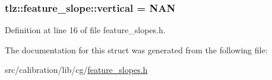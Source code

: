 \subsubsection[{\texorpdfstring{vertical}{vertical}}]{ tlz\+::feature\+\_\+slope\+::vertical = N\+AN}\hypertarget{structtlz_1_1feature__slope_a5dce39e1652c504075245a3e6c2decfc}{}\label{structtlz_1_1feature__slope_a5dce39e1652c504075245a3e6c2decfc}


Definition at line 16 of file feature\+\_\+slopes.\+h.



The documentation for this struct was generated from the following file\+:\begin{DoxyCompactItemize}
\item 
src/calibration/lib/cg/\hyperlink{feature__slopes_8h}{feature\+\_\+slopes.\+h}\end{DoxyCompactItemize}
